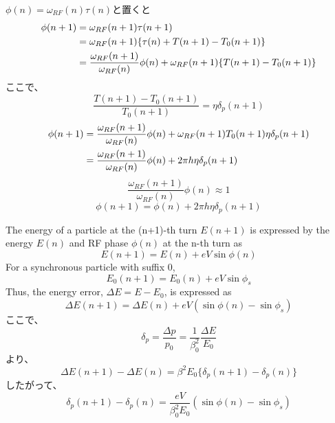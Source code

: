 \documentclass[10pt,a4paper]{ltjsarticle}
\begin{document}
$\phi(n) = \omega_{RF}(n) \tau(n)$と置くと
\begin{align}
    \phi(n+1) &= \omega_{RF}(n+1)\tau(n+1) \notag \\
    &=\omega_{RF}(n+1)\{\tau(n) + T(n+1) -T_0(n+1)\} \notag \\
    &= \frac{\omega_{RF}(n+1)}{\omega_{RF}(n)} \phi(n) + \omega_{RF}(n+1)\{T(n+1) -T_0(n+1)\}  \notag
\end{align}
%
ここで、
%
\begin{equation}
    \frac{T(n+1)-T_0(n+1)}{T_0(n+1)} = \eta \delta_p(n+1)
\end{equation}
%
\begin{align}
    \phi(n+1) &= \frac{\omega_{RF}(n+1)}{\omega_{RF}(n)}\phi(n) + \omega_{RF}(n+1)T_0(n+1)\eta \delta_p(n+1) \notag \\
    &=\frac{\omega_{RF}(n+1)}{\omega_{RF}(n)}\phi(n) + 2\pi h \eta \delta_p(n+1)
\end{align}
%
\begin{equation}
    \frac{\omega_{RF}(n+1)}{\omega_{RF}(n)}\phi(n) \approx 1
\end{equation}
%
\begin{equation}
    \phi(n+1) = \phi(n) + 2\pi h \eta \delta_p(n+1)
\end{equation}

The energy of a particle at the (n+1)-th turn $E(n+1)$ is expressed by the energy $E(n)$ and RF phase $\phi(n)$ at the n-th turn as
%
\begin{equation}
    E(n+1) = E(n) + e V \sin\phi (n)
\end{equation}
%
For a synchronous particle with suffix 0,
%
\begin{equation}
    E_0(n+1) = E_0(n) + e V \sin\phi_s
\end{equation}
%
Thus, the energy error, $\Delta E = E - E_0$, is expressed as
%
\begin{equation}
    \Delta E(n+1) = \Delta E(n) + e V (\sin\phi(n) - \sin\phi_s)
\end{equation}
%
ここで、
%
\begin{equation}
    \delta_p = \frac{\Delta p}{p_0} = \frac{1}{\beta_0^2}\frac{\Delta E}{E_0}
\end{equation}
%
より、
%
\begin{equation}
    \Delta E(n+1) - \Delta E(n) = \beta^2 E_0 \{\delta_p(n+1) - \delta_p(n)\}
\end{equation}
%
したがって、
%
\begin{equation}
    \delta_p(n+1) - \delta_p(n) = \frac{e V}{\beta_0^2 E_0}(\sin\phi(n) -\sin\phi_s)
\end{equation}
%
\end{document}
